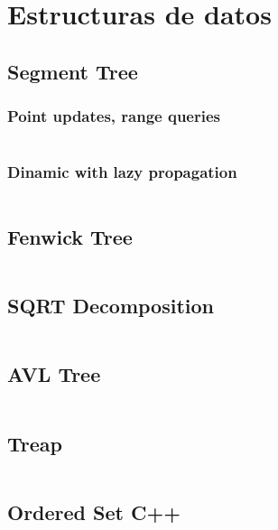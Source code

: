 \documentclass[11pt]{article}
\begin{document}
	\newpage
	\section{Estructuras de datos}
		\subsection{Segment Tree}
			\subsubsection{Point updates, range queries}
			\inputminted[tabsize=2,breaklines,firstline=4,lastline=37,fontsize=\small]{c++}{queries.cpp}
			
			\subsubsection{Dinamic with lazy propagation}
			\inputminted[tabsize=2,breaklines,firstline=39,lastline=90,fontsize=\small]{c++}{queries.cpp}
		
		\subsection{Fenwick Tree}
		\inputminted[tabsize=2,breaklines,firstline=92,lastline=129,fontsize=\small]{c++}{queries.cpp}
		
		\subsection{SQRT Decomposition}
		\inputminted[tabsize=2,breaklines,firstline=131,lastline=209,fontsize=\small]{c++}{queries.cpp}
		
		\subsection{AVL Tree}
		\inputminted[tabsize=2,breaklines,firstline=211,lastline=414,fontsize=\small]{c++}{queries.cpp}
		
		\subsection{Treap}
		\inputminted[tabsize=2,breaklines,firstline=416,lastline=563,fontsize=\small]{c++}{queries.cpp}
		
		\subsection{Ordered Set C++}
		\inputminted[tabsize=2,breaklines,firstline=667,lastline=700,fontsize=\small]{c++}{queries.cpp}
		
\end{document}
